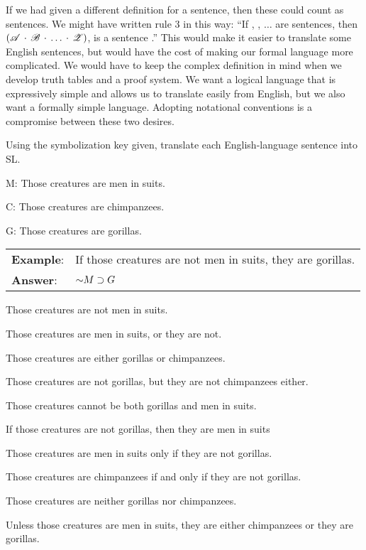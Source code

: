 If we had given a different definition for a sentence, then these could count as sentences. We might have written rule 3 in this way: ``If , , $\ldots$  are sentences, then $(\mathscr{A}\,\cdot\,\mathscr{B}\,\cdot\,\ldots\,\cdot\,\mathscr{Z})$, is a sentence .'' This would make it easier to translate some English sentences, but would have the cost of making our formal language more complicated. We would have to keep the complex definition in mind when we develop truth tables and a proof system. We want a logical language that is expressively simple and allows us to translate easily from English, but we also want a formally simple language. Adopting notational conventions is a compromise between these two desires.


\practiceproblems
\noindent\problempart Using the symbolization key given, translate each English-language sentence into SL.
\label{pr.monkeysuits}
\begin{ekey}
\item[M:] Those creatures are men in suits. 
\item[C:] Those creatures are chimpanzees. 
\item[G:] Those creatures are gorillas.
\end{ekey}

\begin{longtabu}{p{.1\linewidth}p{.9\linewidth}}
\textbf{Example}: & If those creatures are not men in suits, they are gorillas. \\
\textbf{Answer}: & $\mathord{\sim} M \supset G$ \\
\end{longtabu}


\begin{exercises}
\item Those creatures are not men in suits.  
\item Those creatures are men in suits, or they are not.  
\item Those creatures are either gorillas or chimpanzees.  
\item Those creatures are not gorillas, but they are not chimpanzees either.  
\item Those creatures cannot be both gorillas and men in suits.  
\item If those creatures are not gorillas, then they are men in suits  
\item Those creatures are men in suits only if they are not gorillas.  
\item Those creatures are chimpanzees if and only if they are not gorillas.  
\item Those creatures are neither gorillas nor chimpanzees.  %
\item Unless those creatures are men in suits, they are either chimpanzees or they are gorillas.  
\end{exercises}

